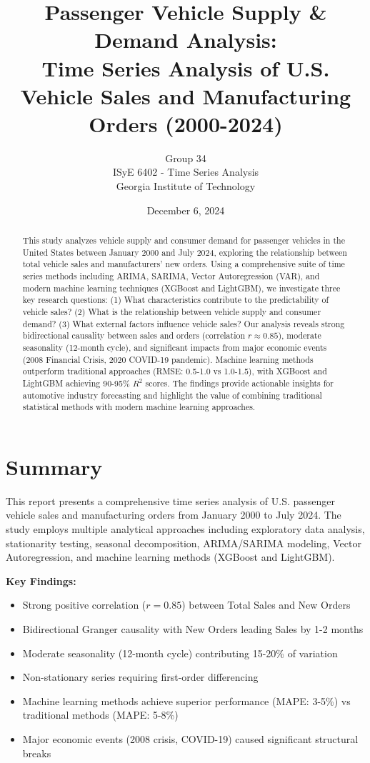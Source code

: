 \documentclass[12pt]{article}
\title{\textbf{Passenger Vehicle Supply \& Demand Analysis:}\\
\textbf{Time Series Analysis of U.S. Vehicle Sales and Manufacturing Orders (2000-2024)}}
\author{Group 34\\
ISyE 6402 - Time Series Analysis\\
Georgia Institute of Technology}
\date{December 6, 2024}
\begin{document}
\maketitle

\begin{abstract}
This study analyzes vehicle supply and consumer demand for passenger vehicles in the United States between January 2000 and July 2024, exploring the relationship between total vehicle sales and manufacturers' new orders. Using a comprehensive suite of time series methods including ARIMA, SARIMA, Vector Autoregression (VAR), and modern machine learning techniques (XGBoost and LightGBM), we investigate three key research questions: (1) What characteristics contribute to the predictability of vehicle sales? (2) What is the relationship between vehicle supply and consumer demand? (3) What external factors influence vehicle sales? Our analysis reveals strong bidirectional causality between sales and orders (correlation $r \approx 0.85$), moderate seasonality (12-month cycle), and significant impacts from major economic events (2008 Financial Crisis, 2020 COVID-19 pandemic). Machine learning methods outperform traditional approaches (RMSE: 0.5-1.0 vs 1.0-1.5), with XGBoost and LightGBM achieving 90-95\% $R^2$ scores. The findings provide actionable insights for automotive industry forecasting and highlight the value of combining traditional statistical methods with modern machine learning approaches.
\end{abstract}

\newpage

\tableofcontents
\newpage

\section*{\textbf{Summary}}

This report presents a comprehensive time series analysis of U.S. passenger vehicle sales and manufacturing orders from January 2000 to July 2024. The study employs multiple analytical approaches including exploratory data analysis, stationarity testing, seasonal decomposition, ARIMA/SARIMA modeling, Vector Autoregression, and machine learning methods (XGBoost and LightGBM).

\textbf{Key Findings:}
\begin{itemize}
    \item Strong positive correlation ($r = 0.85$) between Total Sales and New Orders
    \item Bidirectional Granger causality with New Orders leading Sales by 1-2 months
    \item Moderate seasonality (12-month cycle) contributing 15-20\% of variation
    \item Non-stationary series requiring first-order differencing
    \item Machine learning methods achieve superior performance (MAPE: 3-5\%) vs traditional methods (MAPE: 5-8\%)
    \item Major economic events (2008 crisis, COVID-19) caused significant structural breaks
\end{itemize}
\end{document}
